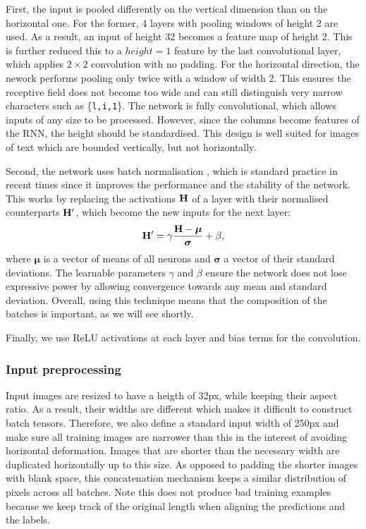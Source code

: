 		First, the input is pooled differently on the vertical dimension than on the horizontal one. For the former, 4 layers with pooling windows of height 2 are used. As a result, an input of height 32 becomes a feature map of height 2. This is further reduced this to a \(\mathit{height} = 1\) feature by the last convolutional layer, which applies \(2 \times 2\) convolution with no padding. For the horizontal direction, the nework performs pooling only twice with a window of width 2. This ensures the receptive field does not become too wide and can still distinguish very narrow characters such as \{\texttt{l,i,1}\}. The network is fully convolutional, which allows inputs of any size to be processed. However, since the columns become features of the RNN, the height should be standardised. This design is well suited for images of text which are bounded vertically, but not horizontally.

		Second, the network uses batch normalisation \citep{batch_norm}, which is standard practice in recent times since it improves the performance and the stability of the network. This works by replacing the activations \(\mathbf{H}\) of a layer with their normalised counterparts \(\mathbf{H}'\), which become the new inputs for the next layer: \[
			\mathbf{H}' = \gamma \frac{\mathbf{H} - \bm{\mu}}{\bm{\sigma}} + \beta,
		\] where \(\bm \mu\) is a vector of means of all neurons and \(\bm \sigma\) a vector of their standard deviations. The learnable parameters \(\gamma\) and \(\beta\) ensure the network does not lose expressive power by allowing convergence towards any mean and standard deviation. Overall, using this technique means that the composition of the batches is important, as we will see shortly.

		Finally, we use ReLU activations at each layer and bias terms for the convolution.

		\subsubsection*{Input preprocessing}

			Input images are resized to have a heigth of 32px, while keeping their aspect ratio. As a result, their widths are different which makes it difficult to construct batch tensors. Therefore, we also define a standard input width of 250px and make sure all training images are narrower than this in the interest of avoiding horizontal deformation. Images that are shorter than the necessary width are duplicated horizontally up to this size. As opposed to padding the shorter images with blank space, this concatenation mechanism keeps a similar distribution of pixels across all batches. Note this does not produce bad training examples because we keep track of the original length when aligning the predictions and the labels.

